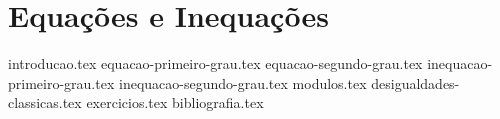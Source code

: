 \chapter{Equações e Inequações}
{
    \newcommand{\chapterdir}{./sections/}
    
    {introducao.tex}
    {equacao-primeiro-grau.tex}
    {equacao-segundo-grau.tex}
    {inequacao-primeiro-grau.tex}
    {inequacao-segundo-grau.tex}
    {modulos.tex}
    {desigualdades-classicas.tex}
    {exercicios.tex}
    {bibliografia.tex} 
}
